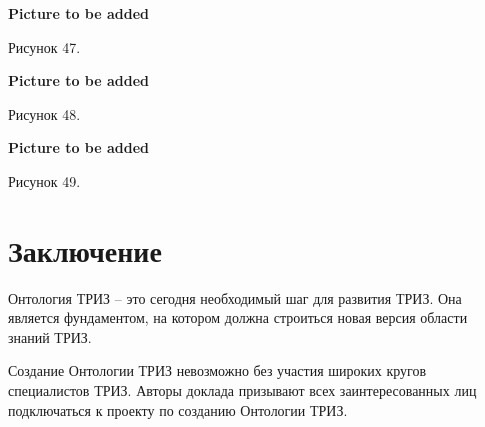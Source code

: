 \documentclass[11pt,a4paper]{article}
\newcommand{\addpicture}{\textbf{Picture to be added}\par}
\begin{document}
\begin{center}
  \addpicture
  Рисунок 47.
\end{center}
\begin{center}
  \addpicture
  Рисунок 48.
\end{center}
\begin{center}
  \addpicture
  Рисунок 49.
\end{center}

\section{Заключение}

Онтология ТРИЗ -- это сегодня необходимый шаг для развития ТРИЗ. Она является
фундаментом, на котором должна строиться новая версия области знаний ТРИЗ.

Создание Онтологии ТРИЗ невозможно без участия широких кругов специалистов
ТРИЗ. Авторы доклада призывают всех заинтересованных лиц подключаться к
проекту по созданию Онтологии ТРИЗ.
\end{document}
